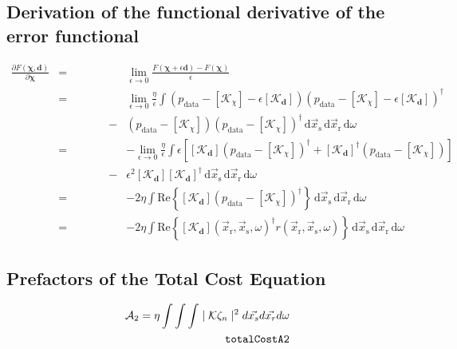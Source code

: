 \documentclass[10pt,a4paper]{article}
\newcommand{\partder}[2]{\ensuremath{\frac{\partial #1}{\partial #2}}}
\newcommand{\df}[1]{\, \ensuremath{\mbox{d}#1}}
\newcommand{\real}[1]{\text{Re} \left\{ #1 \right\}}
\newcommand{\xs}{\vec{x}_\text{s}}
\newcommand{\xr}{\vec{x}_\text{r}}
\begin{document}
{\subsection{Derivation of the functional derivative of the error functional}
\label{deriveerrorfunctional}
\begin{eqnarray*}
\partder{F(\mathbf{\chi}, \mathbf{d})}{\mathbf{\chi}} & = &
\lim_{\epsilon \rightarrow 0} \frac{F(\mathbf{\chi} + \epsilon
\mathbf{d}) - F(\mathbf{\chi})}{\epsilon} \\
& = & \lim_{\epsilon \rightarrow 0} \frac{\eta}{\epsilon} \int
\left(p_{\text{data}} - \left[\mathcal{K}_\chi \right] - \epsilon
\left[\mathcal{K}_\mathbf{d} \right] \right) \left(p_{\text{data}} -
\left[\mathcal{K}_\chi \right] - \epsilon \left[\mathcal{K}_\mathbf{d}
\right] \right)^{\dagger}\\
& \, \, \, \, \, \, \, \, \, \, \, \, \, \, \, \, \, \, \, \, \, \, \,
\, \, \, \, - & \left(p_{\text{data}} - \left[\mathcal{K}_\chi \right]
\right) \left(p_{\text{data}} - \left[\mathcal{K}_\chi \right]
\right)^{\dagger} \df{\xs} \df{\xr} \df{\omega} \\
& = & -\lim_{\epsilon \rightarrow 0} \frac{\eta}{\epsilon} \int
\epsilon \left[ \left[\mathcal{K}_\mathbf{d} \right]
\left(p_{\text{data}} - \left[\mathcal{K}_\chi \right]
\right)^{\dagger} + \left[\mathcal{K}_\mathbf{d} \right]^{\dagger}
\left(p_{\text{data}} - \left[\mathcal{K}_\chi \right] \right) \right]
\\
& \, \, \, \, \, \, \, \, \, \, \, \, \, \, \, \, \, \, \, \, \, \, \,
\, \, \, \, - & \epsilon^2 \left[\mathcal{K}_\mathbf{d} \right]
\left[\mathcal{K}_\mathbf{d} \right]^{\dagger} \df{\xs} \df{\xr}
\df{\omega} \\
& = & -2 \eta \int \real{\left[\mathcal{K}_\mathbf{d} \right]
\left(p_{\text{data}} - \left[\mathcal{K}_\chi \right]
\right)^{\dagger}} \df{\xs} \df{\xr} \df{\omega} \\
& = & -2 \eta \int \real{\left[\mathcal{K}_\mathbf{d} \right](\xr,
\xs, \omega)^{\dagger} r (\xr, \xs, \omega)} \df{\xs} \df{\xr}
\df{\omega}
\end{eqnarray*}

\subsection{Prefactors of the Total Cost Equation}
\label{totalcostprefactors}
\begin{align} \label{eq:totalCostA2} \mathcal{A}_2 = \eta \int \int \int
\mid \mathcal{K} \zeta_n \mid^2 d\vec{x_s}d\vec{x_r}d\omega\\
\tag*{\texttt{totalCostA2}}
\end{align}

}
\end{document}
